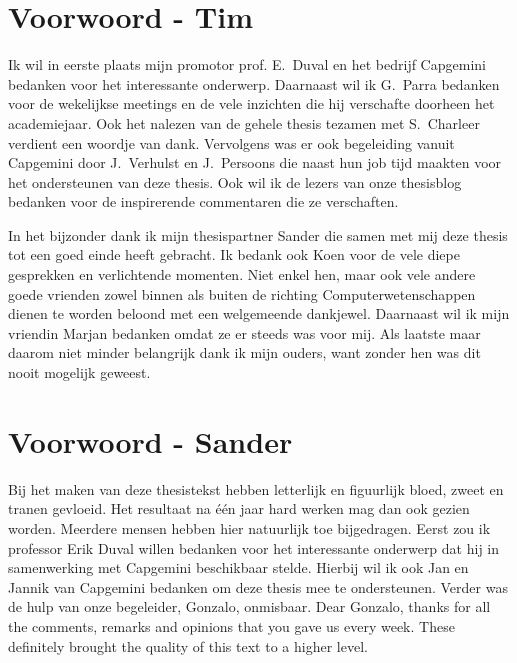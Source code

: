 \documentclass[master=cws,dutch,masteroption={vs,gs},inputenc=utf8]{kulemt}
\begin{document}

\chapter*{Voorwoord - Tim}
Ik wil in eerste plaats mijn promotor prof. E.~Duval en het bedrijf Capgemini bedanken voor het interessante onderwerp.
Daarnaast wil ik G.~Parra bedanken voor de wekelijkse meetings en de vele inzichten die hij verschafte doorheen het academiejaar.
Ook het nalezen van de gehele thesis tezamen met S.~Charleer verdient een woordje van dank.
Vervolgens was er ook begeleiding vanuit Capgemini door J.~Verhulst en J.~Persoons die naast hun job tijd maakten voor het ondersteunen van deze thesis.
Ook wil ik de lezers van onze thesisblog bedanken voor de inspirerende commentaren die ze verschaften.

In het bijzonder dank ik mijn thesispartner Sander die samen met mij deze thesis tot een goed einde heeft gebracht.
Ik bedank ook Koen voor de vele diepe gesprekken en verlichtende momenten. 
Niet enkel hen, maar ook vele andere goede vrienden zowel binnen als buiten de richting Computerwetenschappen dienen te worden beloond met een welgemeende dankjewel.
Daarnaast wil ik mijn vriendin Marjan bedanken omdat ze er steeds was voor mij.
Als laatste maar daarom niet minder belangrijk dank ik mijn ouders, want zonder hen was dit nooit mogelijk geweest.

\chapter*{Voorwoord - Sander}
Bij het maken van deze thesistekst hebben letterlijk en figuurlijk bloed, zweet en tranen gevloeid.
Het resultaat na één jaar hard werken mag dan ook gezien worden.
Meerdere mensen hebben hier natuurlijk toe bijgedragen.
Eerst zou ik professor Erik Duval willen bedanken voor het interessante onderwerp dat hij in samenwerking met Capgemini beschikbaar stelde.
Hierbij wil ik ook Jan en Jannik van Capgemini bedanken om deze thesis mee te ondersteunen.
Verder was de hulp van onze begeleider,  Gonzalo,  onmisbaar.
Dear Gonzalo,  thanks for all the comments,  remarks and opinions that you gave us every week.
These definitely brought the quality of this text to a higher level.
\end{document}
